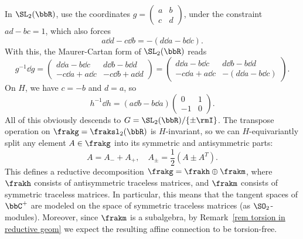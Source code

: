 \begin{example}
    In $\SL_2(\bbR)$, use the coordinates $g=\left(\begin{smallmatrix}
        a & b\\ c& d
    \end{smallmatrix}\right)$, under the constraint $ad-bc=1$, which also forces 
    \[a\dd d-c\dd b=-(d\dd a-b\dd c).\]
    With this, the Maurer-Cartan form of $\SL_2(\bbR)$ reads 
    \[g^{-1}\dd g=\begin{pmatrix}
        d\dd a -b\dd c & d\dd b-b\dd d\\
        -c\dd a+a\dd c & -c\dd b+a\dd d
    \end{pmatrix}=
    \begin{pmatrix}
        d\dd a-b\dd c & d\dd b-b\dd d\\
        -c\dd a+a\dd c & -(d\dd a-b\dd c)
    \end{pmatrix}.
    \]
    On $H$, we have $c=-b$ and $d=a$, so 
    \[h^{-1}\dd h=(a\dd b-b\dd a)\begin{pmatrix}
        0 & 1\\
        -1 & 0
    \end{pmatrix}.\]
    All of this obviously descends to $G=\SL_2(\bbR)\slash \{\pm \rmI\}$. The transpose operation on $\frakg=\fraksl_{2}(\bbR)$ is $H$-invariant, so we can $H$-equivariantly split any element $A\in\frakg$ into its symmetric and antisymmetric parts:
    \[A=A_-+A_+,\quad A_\pm=\frac12(A\pm A^T).\]
    This defines a reductive decomposition $\frakg=\frakh\oplus\frakm$, where $\frakh$ consists of antisymmetric traceless matrices, and $\frakm$ consists of symmetric traceless matrices. In particular, this means that the tangent spaces of $\bbC^+$ are modeled on the space of symmetric traceless matrices (as $\SO_2$-modules). Moreover, since $\frakm$ is a subalgebra, by Remark~\ref{rem torsion in reductive geom} we expect the resulting affine connection to be torsion-free.


\end{example}
